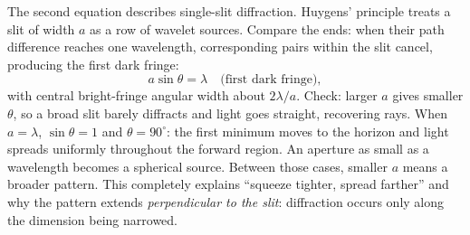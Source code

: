 \begin{mainline}
The second equation describes single-slit diffraction. Huygens' principle treats a slit of width \(a\) as a row of wavelet sources. Compare the ends: when their path difference reaches one wavelength, corresponding pairs within the slit cancel, producing the first dark fringe:
\[
  a\sin\theta = \lambda \quad\text{(first dark fringe)},
\]
with central bright-fringe angular width about \(2\lambda/a\). Check: larger \(a\) gives smaller \(\theta\), so a broad slit barely diffracts and light goes straight, recovering rays. When \(a=\lambda\), \(\sin\theta=1\) and \(\theta=90^\circ\): the first minimum moves to the horizon and light spreads uniformly throughout the forward region. An aperture as small as a wavelength becomes a spherical source. Between those cases, smaller \(a\) means a broader pattern. This completely explains ``squeeze tighter, spread farther'' and why the pattern extends \emph{perpendicular to the slit}: diffraction occurs only along the dimension being narrowed.
\end{mainline}

\begin{center}
\end{center}

